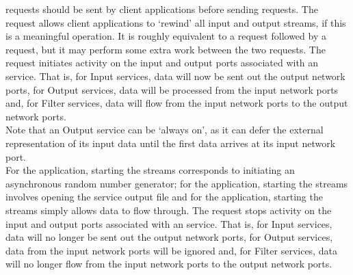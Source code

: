  requests should be sent by
client applications before sending
 requests.
The  request allows client
applications to `rewind' all input and output streams, if this is a meaningful operation.
It is roughly equivalent to a 
request followed by a  request,
but it may perform some extra work between the two requests.
The  request initiates activity
on the input and output ports associated with an  service.
That is, for Input services, data will now be sent out the output \yarp{} network ports,
for Output services, data will be processed from the input \yarp{} network ports and, for
Filter services, data will flow from the input \yarp{} network ports to the output \yarp{}
network ports.\\

Note that an Output service can be `always on', as it can defer the external
representation of its input data until the first data arrives at its input \yarp{}
network port.\\

For the  application, starting the
streams corresponds to initiating an asynchronous random number generator; for the
 application, starting the streams
involves opening the service output file and for the
 application, starting the streams
simply allows data to flow through.
The  request stops activity on
the input and output ports associated with an  service.
That is, for Input services, data will no longer be sent out the output \yarp{} network
ports, for Output services, data from the input \yarp{} network ports will be ignored and,
for Filter services, data will no longer flow from the input \yarp{} network ports to the
output \yarp{} network ports.\\

